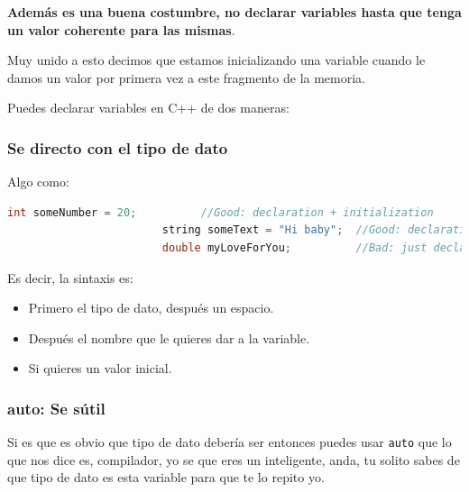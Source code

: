 \documentclass[12pt, fleqn]{report}                             %
\theoremstyle{break}                                            %
\newcommand{\textCode}[1]  { \texttt{#1} }                      %
\begin{document}
                \textbf{Además es una buena costumbre, no declarar variables hasta que tenga un valor coherente para
                las mismas}.

                \clearpage

                Muy unido a esto decimos que estamos inicializando una variable cuando le damos
                un valor por primera vez a este fragmento de la memoria.
                
                Puedes declarar variables en C++ de dos maneras:

                \subsubsection{Se directo con el tipo de dato}

                    Algo como:
                    \begin{lstlisting}[language=C++, gobble=24]
                        int someNumber = 20;          //Good: declaration + initialization
                        string someText = "Hi baby";  //Good: declaration + initialization
                        double myLoveForYou;          //Bad: just declaration
                    \end{lstlisting}

                    Es decir, la sintaxis es:
                    \begin{itemize}
                        \item Primero el tipo de dato, después un espacio.
                        \item Después el nombre que le quieres dar a la variable.
                        \item Si quieres un valor inicial.
                    \end{itemize} 

                \subsubsection{auto: Se sútil}

                    Si es que es obvio que tipo de dato debería ser entonces puedes usar \textCode{auto}
                    que lo que nos dice es, compilador, yo se que eres un inteligente, anda, 
                    tu solito sabes de que tipo de dato es esta variable para que te lo repito yo.
                    
\end{document}

